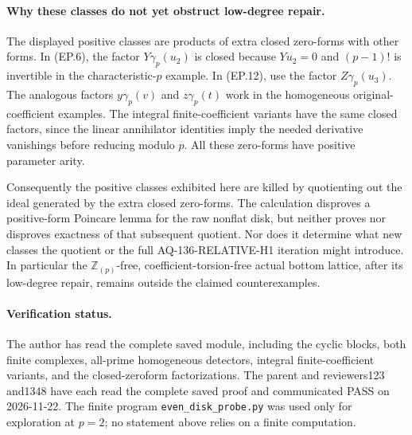 \paragraph{Why these classes do not yet obstruct low-degree repair.}
The displayed positive classes are products of extra closed
zero-forms with other forms. In (EP.6), the factor
\(Y\gamma_p(u_2)\) is closed because \(Yu_2=0\) and
\((p-1)!\) is invertible in the characteristic-\(p\) example.
In (EP.12), use the factor \(Z\gamma_p(u_3)\).
The analogous factors \(y\gamma_p(v)\) and
\(z\gamma_p(t)\) work in the homogeneous original-coefficient
examples. The integral finite-coefficient variants have the same
closed factors, since the linear annihilator identities imply
the needed derivative vanishings before reducing modulo \(p\).
All these zero-forms have positive parameter arity.

Consequently the positive classes exhibited here are killed
by quotienting out the ideal generated by the extra closed
zero-forms. The calculation disproves a positive-form
Poincare lemma for the raw nonflat disk, but neither proves
nor disproves exactness of that subsequent quotient. Nor does
it determine what new classes the quotient or the full
AQ-136-RELATIVE-H1 iteration might introduce. In particular
the \(\mathbb Z_{(p)}\)-free, coefficient-torsion-free
actual bottom lattice, after its low-degree repair, remains
outside the claimed counterexamples.

\paragraph{Verification status.}
The author has read the complete saved module, including the cyclic
blocks, both finite complexes, all-prime homogeneous detectors,
integral finite-coefficient variants, and the closed-zeroform
factorizations. The parent and reviewers123 and1348 have each read
the complete saved proof and communicated PASS on 2026-11-22. The finite program
\texttt{even\_disk\_probe.py} was used only for exploration
at \(p=2\); no statement above relies on a finite computation.
